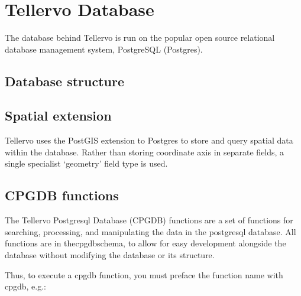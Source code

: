 \chapter{Tellervo Database}

The database behind Tellervo is run on the popular open source relational database management system, PostgreSQL (Postgres). 


\section{Database structure}


\section{Spatial extension}

Tellervo uses the PostGIS extension to Postgres to store and query spatial data within the database.  Rather than storing coordinate axis in separate fields, a single specialist `geometry' field type is used.


\section{CPGDB functions}
\label{txt:cpgdbfunctions}
The Tellervo Postgresql Database (CPGDB) functions are a set of functions for searching, processing, and manipulating the data in the postgresql database. All functions are in thecpgdbschema, to allow for easy development alongside the database without modifying the database or its structure.

Thus, to execute a cpgdb function, you must preface the function name with cpgdb, e.g.: 




